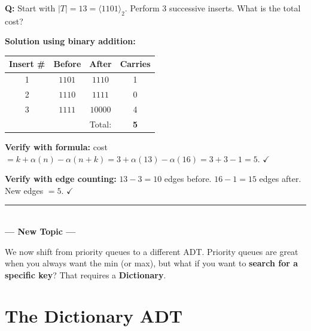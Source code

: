 \documentclass[11pt]{article}
\begin{document}
\begin{examplebox}
\textbf{Q:} Start with $|T| = 13 = \langle 1101 \rangle_2$. Perform 3 successive inserts. What is the total cost?

\begin{answerband}
\textbf{Solution using binary addition:}
\begin{center}
\renewcommand{\arraystretch}{1.3}
\begin{tabular}{c|c|c|c}
Insert \# & Before & After & Carries \\
\hline
1 & $1101$ & $1110$ & 1 \\
2 & $1110$ & $1111$ & 0 \\
3 & $1111$ & $10000$ & 4 \\
\hline
& & Total: & \textbf{5} \\
\end{tabular}
\end{center}

\textbf{Verify with formula:} cost $= k + \alpha(n) - \alpha(n+k) = 3 + \alpha(13) - \alpha(16) = 3 + 3 - 1 = 5$. $\checkmark$

\textbf{Verify with edge counting:} $13 - 3 = 10$ edges before. $16 - 1 = 15$ edges after. New edges $= 5$. $\checkmark$
\end{answerband}
\end{examplebox}

\newpage


\begin{center}
\textcolor{greyline}{\rule{0.6\linewidth}{0.6pt}}\\[6pt]
{\large\textcolor{utnavy}{\textbf{--- New Topic ---}}}
\end{center}

We now shift from priority queues to a different ADT. Priority queues are great when you always want the min (or max), but what if you want to \textbf{search for a specific key}? That requires a \textbf{Dictionary}.

\section{The Dictionary ADT}
\end{document}
